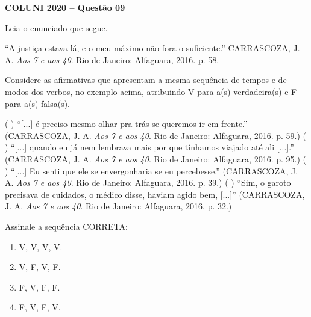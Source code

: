 \textbf{COLUNI 2020 -- Questão 09}\par\medskip Leia o enunciado que segue.

\par

“A justiça \underline{estava} lá, e o meu máximo não \underline{fora} o suficiente.” CARRASCOZA, J. A. \textit{Aos 7 e aos 40}. Rio de Janeiro: Alfaguara, 2016. p. 58.

\par

Considere as afirmativas que apresentam a mesma sequência de tempos e de modos dos verbos, no exemplo acima, atribuindo V para a(s) verdadeira(s) e F para a(s) falsa(s).

\par

( ) “[...] é preciso mesmo olhar pra trás se queremos ir em frente.” (CARRASCOZA, J. A. \textit{Aos 7 e aos 40}. Rio de Janeiro: Alfaguara, 2016. p. 59.) ( ) “[...] quando eu já nem lembrava mais por que tínhamos viajado até ali [...].” (CARRASCOZA, J. A. \textit{Aos 7 e aos 40}. Rio de Janeiro: Alfaguara, 2016. p. 95.) ( ) “[...] Eu senti que ele se envergonharia se eu percebesse.” (CARRASCOZA, J. A. \textit{Aos 7 e aos 40}. Rio de Janeiro: Alfaguara, 2016. p. 39.) ( ) “Sim, o garoto precisava de cuidados, o médico disse, haviam agido bem, [...]” (CARRASCOZA, J. A. \textit{Aos 7 e aos 40}. Rio de Janeiro: Alfaguara, 2016. p. 32.)

\par

Assinale a sequência CORRETA:\begin{enumerate}
\item V, V, V, V.
\item V, F, V, F.
\item F, V, F, F.
\item F, V, F, V.\end{enumerate}
